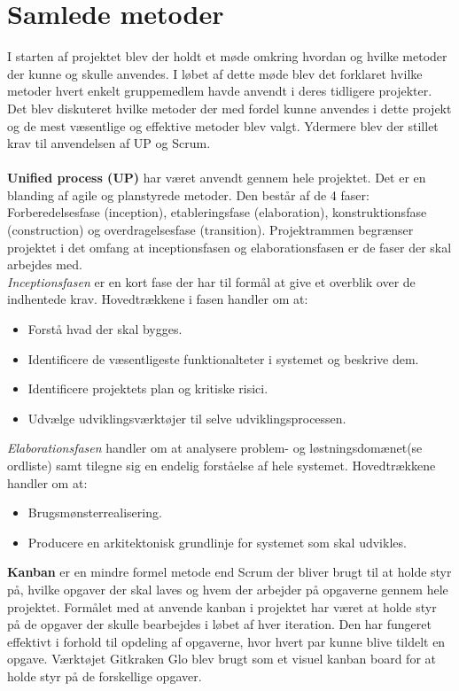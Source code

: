 \section{Samlede metoder} \label{sec:samlede metoder}
I starten af projektet blev der holdt et møde omkring hvordan og hvilke metoder der kunne og skulle anvendes. I løbet af dette møde blev det forklaret hvilke metoder hvert enkelt gruppemedlem havde anvendt i deres tidligere projekter. Det blev diskuteret hvilke metoder der med fordel kunne anvendes i dette projekt og de mest væsentlige og effektive metoder blev valgt. Ydermere blev der stillet krav til anvendelsen af UP og Scrum. \\ 
\\
\textbf{ Unified process (UP)} har været anvendt gennem hele projektet. Det er en blanding af agile og planstyrede metoder. Den består af de 4 faser: 
Forberedelsesfase (inception), etableringsfase (elaboration), konstruktionsfase (construction) og overdragelsesfase (transition). 
Projektrammen begrænser projektet i det omfang at inceptionsfasen og elaborationsfasen er de faser der skal arbejdes med.\\ 
\emph{Inceptionsfasen} er en kort fase der har til formål at give et overblik over de indhentede krav. Hovedtrækkene i fasen handler om at: 
\begin{itemize}
\item Forstå hvad der skal bygges.
\item Identificere de væsentligeste funktionalteter i systemet og beskrive dem.
\item Identificere projektets plan og kritiske risici.
\item Udvælge udviklingsværktøjer til selve udviklingsprocessen.
\end{itemize}
\emph{Elaborationsfasen} handler om at analysere problem- og løstningsdomænet(se ordliste) samt tilegne sig en endelig forståelse af hele systemet. Hovedtrækkene handler om at: 
\begin{itemize}
\item Brugsmønsterrealisering.
\item Producere en arkitektonisk grundlinje for systemet som skal udvikles.
\end{itemize}
\textbf{Kanban} er en mindre formel metode end Scrum der bliver brugt til at holde styr på, hvilke opgaver der skal laves og hvem der arbejder på opgaverne gennem hele projektet. Formålet med at anvende kanban i projektet har været at holde styr på de opgaver der skulle bearbejdes i løbet af hver iteration. Den har fungeret effektivt i forhold til opdeling af opgaverne, hvor hvert par kunne blive tildelt en opgave. Værktøjet Gitkraken Glo blev brugt som et visuel kanban board for at holde styr på de forskellige opgaver.\\

